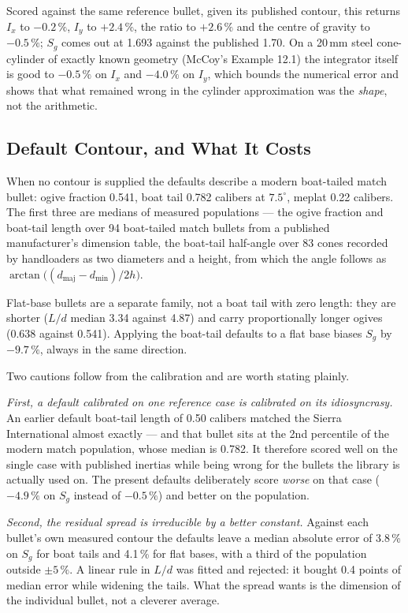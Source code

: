 \documentclass[11pt,twoside,openright]{report}
\begin{document}
Scored against the same reference bullet, given its published contour, this returns
$I_x$ to $-0.2\,\%$, $I_y$ to $+2.4\,\%$, the ratio to $+2.6\,\%$ and the centre of
gravity to $-0.5\,\%$; $S_g$ comes out at 1.693 against the published 1.70. On a
20\,mm steel cone-cylinder of exactly known geometry (McCoy's Example 12.1) the
integrator itself is good to $-0.5\,\%$ on $I_x$ and $-4.0\,\%$ on $I_y$, which
bounds the numerical error and shows that what remained wrong in the cylinder
approximation was the \emph{shape}, not the arithmetic.

\subsection{Default Contour, and What It Costs}

When no contour is supplied the defaults describe a modern boat-tailed match
bullet: ogive fraction 0.541, boat tail 0.782 calibers at $7.5^{\circ}$, meplat
0.22 calibers. The first three are medians of measured populations --- the ogive
fraction and boat-tail length over 94 boat-tailed match bullets from a published
manufacturer's dimension table, the boat-tail half-angle over 83 cones recorded by
handloaders as two diameters and a height, from which the angle follows as
$\arctan\!\bigl((d_{\mathrm{maj}} - d_{\mathrm{min}})/2h\bigr)$.

Flat-base bullets are a separate family, not a boat tail with zero length: they are
shorter ($L/d$ median 3.34 against 4.87) and carry proportionally longer ogives
(0.638 against 0.541). Applying the boat-tail defaults to a flat base biases $S_g$
by $-9.7\,\%$, always in the same direction.

Two cautions follow from the calibration and are worth stating plainly.

\emph{First, a default calibrated on one reference case is calibrated on its
idiosyncrasy.} An earlier default boat-tail length of 0.50 calibers matched the
Sierra International almost exactly --- and that bullet sits at the 2nd percentile
of the modern match population, whose median is 0.782. It therefore scored well on
the single case with published inertias while being wrong for the bullets the
library is actually used on. The present defaults deliberately score \emph{worse}
on that case ($-4.9\,\%$ on $S_g$ instead of $-0.5\,\%$) and better on the
population.

\emph{Second, the residual spread is irreducible by a better constant.} Against
each bullet's own measured contour the defaults leave a median absolute error of
3.8\,\% on $S_g$ for boat tails and 4.1\,\% for flat bases, with a third of the
population outside $\pm 5\,\%$. A linear rule in $L/d$ was fitted and rejected: it
bought 0.4 points of median error while widening the tails. What the spread wants
is the dimension of the individual bullet, not a cleverer average.
\end{document}
